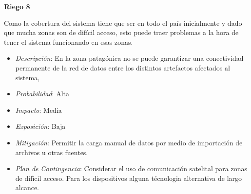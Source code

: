 \textbf{Riego 8}

Como la cobertura del sistema tiene que ser en todo el pa\'is inicialmente y dado que mucha zonas son de dif\'icil acceso, esto puede traer problemas a la hora de tener el sistema funcionando en esas zonas.

\begin{itemize}
 \item \textsl{Descripci\'on}: En la zona patagónica no se puede garantizar una conectividad permanente de la red de datos entre los distintos artefactos afectados al sistema,
 \item \textsl{Probabilidad}: Alta
 \item \textsl{Impacto}: Media
 \item \textsl{Exposición}: Baja
 \item \textsl{Mitigación}: Permitir la carga manual de datos por medio de importación de archivos u otras fuentes.
 \item \textsl{Plan de Contingencia}: Considerar el uso de comunicaci\'on satelital para zonas de dif\'icil acceso. Para los dispositivos alguna t\'ecnologia alternativa de largo alcance.
\end{itemize}
